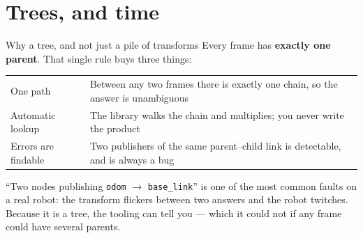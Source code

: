 \documentclass[aspectratio=169]{beamer}
\begin{document}
\section{Trees, and time}

\begin{frame}{Why a tree, and not just a pile of transforms}
  \small
  Every frame has \textbf{exactly one parent}. That single rule buys three things:

  \vspace{0.6em}
  \begin{center}
  \begin{tabular}{@{}p{3.2cm}p{7.5cm}@{}}
    \toprule
    One path & Between any two frames there is exactly one chain, so the answer is unambiguous \\[0.3em]
    Automatic lookup & The library walks the chain and multiplies; you never write the product \\[0.3em]
    Errors are findable & Two publishers of the same parent--child link is detectable, and is
      always a bug \\
    \bottomrule
  \end{tabular}
  \end{center}

  \vspace{0.7em}
  \begin{inthefield}
    \footnotesize
    ``Two nodes publishing \texttt{odom} $\rightarrow$ \texttt{base\_link}'' is one of the most
    common faults on a real robot: the transform flickers between two answers and the robot
    twitches. Because it is a tree, the tooling can tell you --- which it could not if any frame
    could have several parents.
  \end{inthefield}
\end{frame}
\end{document}
